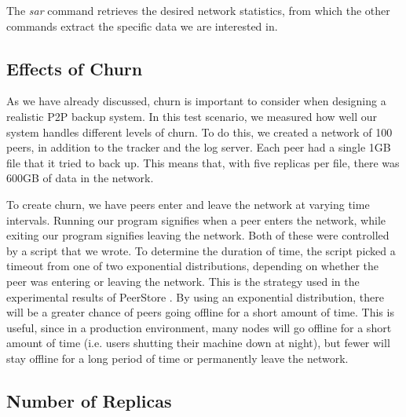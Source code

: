 \documentclass[12pt]{report}
\begin{document}
The \textit{sar} command retrieves the desired network statistics, from which the other commands extract the specific data we are interested in.

\subsection{Effects of Churn} \label{subsec:EffectsofChurn_sec:TestScenarios_chap:Methodology}

As we have already discussed, churn is important to consider when designing a realistic P2P backup system. In this test scenario, we measured how well our system handles different levels of churn. To do this, we created a network of 100 peers, in addition to the tracker and the log server. Each peer had a single 1GB file that it tried to back up. This means that, with five replicas per file, there was 600GB of data in the network.

To create churn, we have peers enter and leave the network at varying time intervals. Running our program signifies when a peer enters the network, while exiting our program signifies leaving the network. Both of these were controlled by a script that we wrote. To determine the duration of time, the script picked a timeout from one of two exponential distributions, depending on whether the peer was entering or leaving the network. This is the strategy used in the experimental results of PeerStore \cite{PeerStore}. By using an exponential distribution, there will be a greater chance of peers going offline for a short amount of time. This is useful, since in a production environment, many nodes will go offline for a short amount of time (i.e. users shutting their machine down at night), but fewer will stay offline for a long period of time or permanently leave the network.


\subsection{Number of Replicas} \label{subsec:NumberofReplicas_sec:TestScenarios_chap:Methodology}
\end{document}
